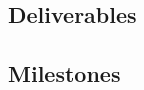 \documentclass[conference]{IEEEtran} %
\begin{document}
\subsection{Deliverables}
\label{subsec:deliverables}


\subsection{Milestones}
\label{subsec:milestones}


\end{document}
